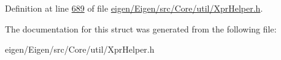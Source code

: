 Definition at line \hyperlink{eigen_2_eigen_2src_2_core_2util_2_xpr_helper_8h_source_l00689}{689} of file \hyperlink{eigen_2_eigen_2src_2_core_2util_2_xpr_helper_8h_source}{eigen/\+Eigen/src/\+Core/util/\+Xpr\+Helper.\+h}.



The documentation for this struct was generated from the following file\+:\begin{DoxyCompactItemize}
\item 
eigen/\+Eigen/src/\+Core/util/\+Xpr\+Helper.\+h\end{DoxyCompactItemize}
